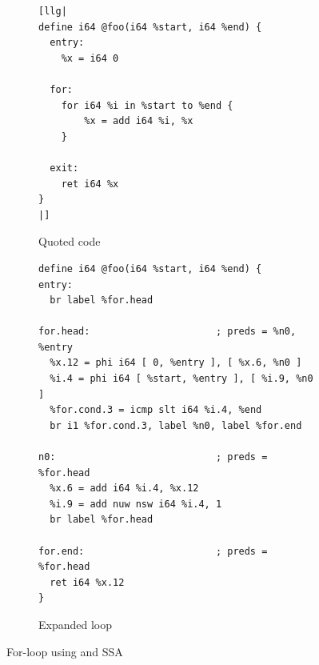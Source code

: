 \documentclass[a4paper,bibliography=totocnumbered,parskip,headsepline]{scrbook}
\begin{document}
\begin{figure}
\begin{subfigure}{\textwidth}
\begin{lstlisting}
[llg|
define i64 @foo(i64 %start, i64 %end) {
  entry:
    %x = i64 0

  for:
    for i64 %i in %start to %end {
        %x = add i64 %i, %x
    }

  exit:
    ret i64 %x
}
|]
\end{lstlisting}
\caption{Quoted code}
\label{fig:forquoteSSA1}
\end{subfigure}

\begin{subfigure}{\textwidth}
\begin{lstlisting}
define i64 @foo(i64 %start, i64 %end) {
entry:
  br label %for.head

for.head:                      ; preds = %n0, %entry
  %x.12 = phi i64 [ 0, %entry ], [ %x.6, %n0 ]
  %i.4 = phi i64 [ %start, %entry ], [ %i.9, %n0 ]
  %for.cond.3 = icmp slt i64 %i.4, %end
  br i1 %for.cond.3, label %n0, label %for.end

n0:                            ; preds = %for.head
  %x.6 = add i64 %i.4, %x.12
  %i.9 = add nuw nsw i64 %i.4, 1
  br label %for.head

for.end:                       ; preds = %for.head
  ret i64 %x.12
}
\end{lstlisting}
\caption{Expanded loop}
\label{fig:forquoteSSA2}
\end{subfigure}
\caption{For-loop using  and SSA}
\label{fig:forquoteSSA}
\end{figure}
\end{document}
